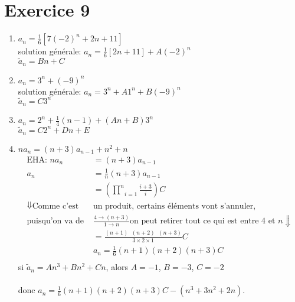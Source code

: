 \documentclass[fontsize=10pt]{article}
\begin{document}
\section*{Exercice 9}
\begin{enumerate}
\item $a_n = \frac{1}{6} \left[7(-2)^n + 2n + 11 \right]$\\
solution générale: $a_n = \frac{1}{6}\left[2n + 11\right] + A(-2)^n$\\
$\tilde{a}_n = Bn + C$
\item $a_n = 3^n + (-9)^n$\\
solution générale: $a_n = 3^n + A1^n + B(-9)^n$\\
$\tilde{a}_n = C3^n$
\item $a_n = 2^n + \frac{1}{4}(n-1) + (An + B)3^n$\\
$\tilde{a}_n = C2^n + Dn + E$
\item $na_n = (n+3)a_{n-1} + n^2 + n$
\begin{align*}
\text{EHA: } na_n &= (n+3)a_{n-1}\\
a_n &= \frac{1}{n}(n+3)a_{n-1}\\
&= \left(\underset{i=1}{\overset{n}{\prod}} \frac{i + 3}{i} \right)C\\
\Downarrow \text{Comme c'est } & \text{un produit, certains éléments vont s'annuler,}\\
\text{puisqu'on va de } &\frac{4\rightarrow(n+3)}{1\rightarrow n} \text{on peut retirer tout ce qui est entre 4 et $n$}\Downarrow\\
&= \frac{(n+1)\phantom{a}(n+2)\phantom{a}(n+3)}{3 \times 2 \times 1}C\\
& a_n = \frac{1}{6}(n+1)(n+2)(n+3)C\\
\end{align*}
si $\tilde{a}_n = An^3 + Bn^2 + Cn$, alors $A=-1$, $B=-3$, $C=-2$\\\\
donc $a_n = \frac{1}{6}(n+1)(n+2)(n+3)C - (n^3 + 3n^2 + 2n)$.
\end{enumerate}
\end{document}
